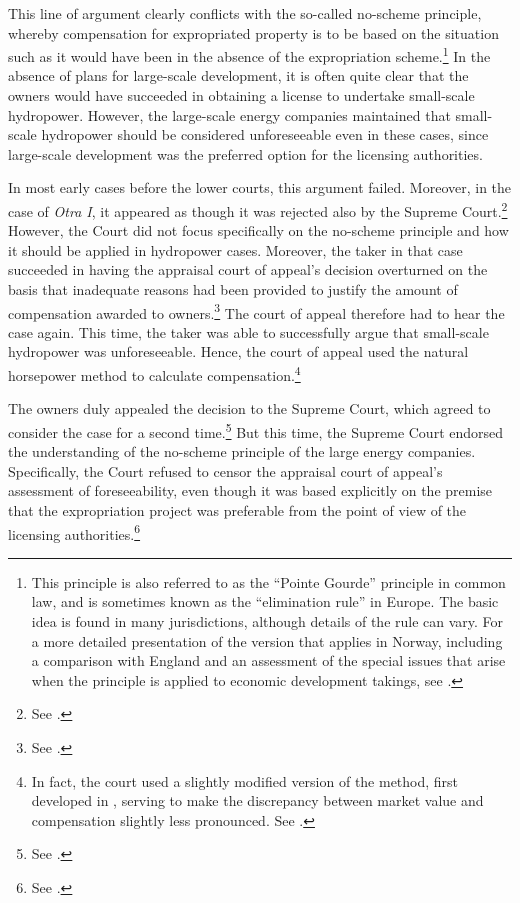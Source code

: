 This line of argument clearly conflicts with the so-called no-scheme principle, whereby compensation for expropriated property is to be based on the situation such as it would have been in the absence of the expropriation scheme.\footnote{This principle is also referred to as the ``Pointe Gourde'' principle in common law, and is sometimes known as the ``elimination rule''  in Europe. The basic idea is found in many jurisdictions, although details of the rule can vary. For a more detailed presentation of the version that applies in Norway, including a comparison with England and an assessment of the special issues that arise when the principle is applied to economic development takings, see \cite{dyrkolbotn15}.} In the absence of plans for large-scale development, it is often quite clear that the owners would have succeeded in obtaining a license to undertake small-scale hydropower. However, the large-scale energy companies maintained that small-scale hydropower should be considered unforeseeable even in these cases, since large-scale development was the preferred option for the licensing authorities.

In most early cases before the lower courts, this argument failed. Moreover, in the case of {\it Otra I}, it appeared as though it was rejected also by the Supreme Court.\footnote{See \cite[31-48]{otra10}.} However, the Court did not focus specifically on the no-scheme principle and how it should be applied in hydropower cases. Moreover, the taker in that case succeeded in having the appraisal court of appeal's decision overturned on the basis that inadequate reasons had been provided to justify the amount of compensation awarded to owners.\footnote{See \cite[52]{otra10}.} The court of appeal therefore had to hear the case again. This time, the taker was able to successfully argue that small-scale hydropower was unforeseeable. Hence, the court of appeal used the natural horsepower method to calculate compensation.\footnote{In fact, the court used a slightly modified version of the method, first developed in \cite{sauda09}, serving to make the discrepancy between market value and compensation slightly less pronounced. See \cite{otra12}.} 

The owners duly appealed the decision to the Supreme Court, which agreed to consider the case for a second time.\footnote{See \cite{otra13}.} But this time, the Supreme Court endorsed the understanding of the no-scheme principle of the large energy companies. Specifically, the Court refused to censor the appraisal court of appeal's assessment of foreseeability, even though it was based explicitly on the premise that the expropriation project was preferable from the point of view of the licensing authorities.\footnote{See \cite[53-54]{otra13}.} %

